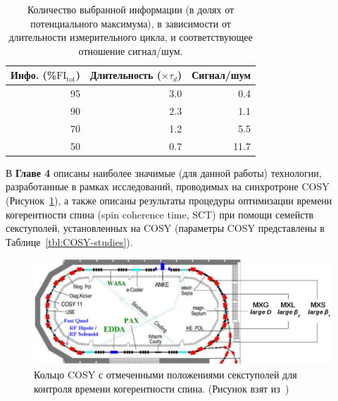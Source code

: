 \begin{table}[H]
	\caption{Количество выбранной информации (в долях от потенциального максимума), 
		в зависимости от длительности измерительного цикла, 
		и соответствующее отношение сигнал/шум.\label{tbl:FItot}}
	\centering
	\begin{tabular}{rrr}
		\toprule
		Инфо. (\%$\mathrm{FI_{tot}}$) & Длительность ($\times\tau_d$) & Сигнал/шум  \\
		\midrule
		95            & 3.0                     & 0.4         \\
		90            & 2.3                     & 1.1         \\
		70            & 1.2                     & 5.5         \\
		50            & 0.7                     & 11.7        \\
		\bottomrule
	\end{tabular}
\end{table}

В \textbf{Главе 4} описаны наиболее значимые (для данной работы) технологии, 
разработанные в рамках исследований, проводимых на синхротроне COSY (Рисунок~\ref{fig:COSY_Ring}), 
а также описаны результаты процедуры оптимизации времени когерентности спина (spin coherence time, SCT) 
при помощи семейств секступолей, установленных на COSY
(параметры COSY  представлены в Таблице~\ref{tbl:COSY-studies}).

\begin{figure}[H]\centering
	\includegraphics[width=\linewidth]{images/chapter4/COSY-sextupoles}
	\caption{Кольцо COSY с отмеченными положениями секступолей для контроля времени когерентности спина. (Рисунок взят из~\cite{Guidoboni:STORI14})\label{fig:COSY_Ring}}
\end{figure}


